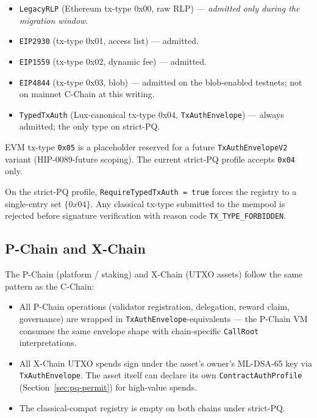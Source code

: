 \begin{itemize}[leftmargin=2em,nosep]
  \item \texttt{LegacyRLP} (Ethereum tx-type 0x00, raw RLP) ---
    \emph{admitted only during the migration window}.
  \item \texttt{EIP2930} (tx-type 0x01, access list) --- admitted.
  \item \texttt{EIP1559} (tx-type 0x02, dynamic fee) --- admitted.
  \item \texttt{EIP4844} (tx-type 0x03, blob) --- admitted on the
    blob-enabled testnets; not on mainnet C-Chain at this writing.
  \item \texttt{TypedTxAuth} (Lux-canonical tx-type 0x04,
    \texttt{TxAuthEnvelope}) --- always admitted; the only type on strict-PQ.
\end{itemize}

EVM tx-type \texttt{0x05} is a placeholder reserved for a future
\texttt{TxAuthEnvelopeV2} variant (HIP-0089-future scoping). The current
strict-PQ profile accepts \texttt{0x04} only.

On the strict-PQ profile, \texttt{RequireTypedTxAuth = true} forces the
registry to a single-entry set $\{0x04\}$. Any classical tx-type submitted
to the mempool is rejected before signature verification with reason code
\texttt{TX\_TYPE\_FORBIDDEN}.

\subsection{P-Chain and X-Chain}

The P-Chain (platform / staking) and X-Chain (UTXO assets) follow the same
pattern as the C-Chain:

\begin{itemize}[leftmargin=2em,nosep]
  \item All P-Chain operations (validator registration, delegation, reward
    claim, governance) are wrapped in \texttt{TxAuthEnvelope}-equivalents
    --- the P-Chain VM consumes the same envelope shape with chain-specific
    \texttt{CallRoot} interpretations.
  \item All X-Chain UTXO spends sign under the asset's owner's ML-DSA-65
    key via \texttt{TxAuthEnvelope}. The asset itself can declare its own
    \texttt{ContractAuthProfile} (Section~\ref{sec:pq-permit}) for
    high-value spends.
  \item The classical-compat registry is empty on both chains under
    strict-PQ.
\end{itemize}

